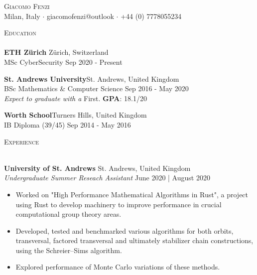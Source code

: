 \documentclass[a4paper]{article}
\newcommand{\lineunder} {
    \vspace*{-8pt} \\
    \hspace*{-18pt} \hrulefill \\
}
\newcommand{\header} [1] {
    {\hspace*{-18pt}\vspace*{6pt} \textsc{#1}}
    \vspace*{-6pt} \lineunder
}
\begin{document}
\vspace*{-40pt}



\vspace*{-10pt}
\begin{center}
    {\Huge \scshape {Giacomo Fenzi}}\\
    Milan, Italy $\cdot$ giacomofenzi@outlook $\cdot$ +44 (0) 7778055234\\
\end{center}

\header{Education}
\textbf{ETH Zürich} \hfill Zürich, Switzerland \\
MSc CyberSecurity \hfill Sep 2020 - Present \\
\vspace{2mm}

\textbf{St. Andrews University}\hfill St. Andrews, United Kingdom\\
BSc Mathematics \& Computer Science \hfill Sep 2016 - May 2020\\
\textit{Expect to graduate with a} First. \textbf{GPA}: 18.1/20 \\
\vspace{2mm}

\textbf{Worth School}\hfill Turners Hills, United Kingdom\\
IB Diploma (39/45) \hfill Sep 2014 - May 2016 \\

\vspace{2mm}

\header{Experience}
\vspace{1mm}

\textbf{University of St. Andrews} \hfill St. Andrews, United Kingdom \\
\textit{Undergraduate Summer Reseach Assistant} \hfill{June 2020 | August 2020}
\vspace{-1mm}
\begin{itemize}
    \item Worked on "High Performance Mathematical Algorithms in Rust", a project
          using Rust to develop machinery to improve performance in crucial computational group theory areas.
    \item Developed, tested and benchmarked various algorithms for both orbits, transversal,
          factored transversal and ultimately stabilizer chain constructions, using the Schreier–Sims algorithm.
    \item Explored performance of Monte Carlo variations of these methods.
\end{itemize}
\end{document}
